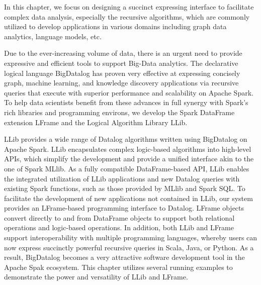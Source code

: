 In this chapter, we focus on designing a succinct expressing interface to facilitate complex data analysis, especially the recursive algorithms, which are commonly utilized to develop applications in various domains including graph data analytics, language models, etc.

Due to the ever-increasing volume of data, there is an urgent need to provide expressive and efficient %
tools to support Big-Data analytics.
The declarative logical  language BigDatalog %
has proven very effective at expressing concisely graph, machine learning, and knowledge discovery applications via recursive queries that execute with superior 
performance and scalability  on  Apache Spark. 
To help data scientists benefit from these advances in full synergy with  Spark's rich libraries and programming environs, we develop the  Spark DataFrame extension LFrame and the Logical Algorithm Library  LLib.

LLib provides a wide range of Datalog algorithms written using BigDatalog  on Apache Spark. LLib encapsulates complex logic-based algorithms into 
high-level APIs, which simplify the development and   provide a unified interface akin to the one of Spark MLlib.   As a fully compatible
DataFrame-based API, LLib enables the integrated utilization of LLib 
applications and new Datalog queries with existing Spark functions, such 
as those provided by MLlib and Spark SQL. 
To facilitate the development 
of new applications not contained in LLib, our system provides an 
LFrame-based  programming interface to Datalog.
LFrame objects convert directly to and from DataFrame objects to support both relational operations and  logic-based operations. 
In addition, both LLib and LFrame support interoperability with multiple programming languages, whereby users can now  express  succinctly powerful recursive queries in 
Scala, Java, or Python. 
As a result, BigDatalog becomes a very attractive software development tool in the Apache Spak ecosystem. 
This chapter utilizes several running examples to demonstrate the  power and versatility of LLib and LFrame.

